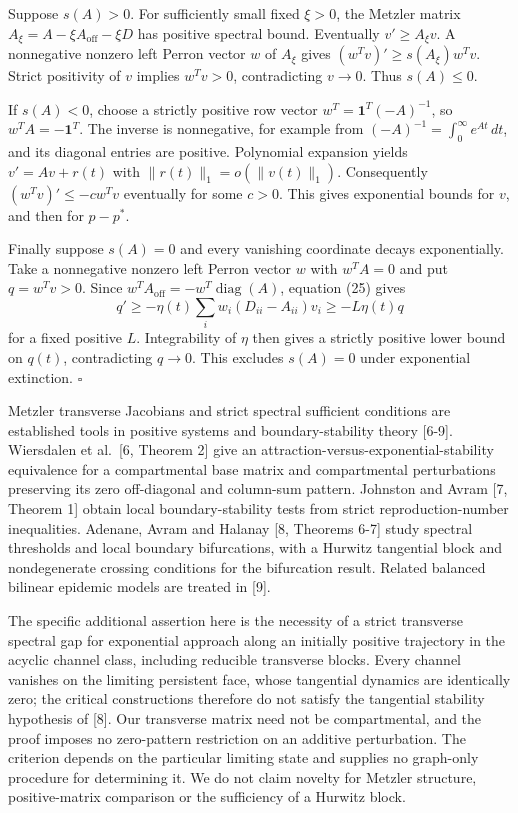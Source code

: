 \documentclass[
  11pt,
  a4paper,
]{scrartcl}
\begin{document}
Suppose \(s(A)>0\). For sufficiently small fixed \(\xi>0\), the Metzler
matrix \(A_{\xi}=A-\xi A_{\mathrm{off}}-\xi D\) has positive spectral
bound. Eventually \(v'\ge A_{\xi}v\). A nonnegative nonzero left Perron
vector \(w\) of \(A_{\xi}\) gives \((w^Tv)'\ge s(A_{\xi})w^Tv\). Strict
positivity of \(v\) implies \(w^Tv>0\), contradicting \(v\to0\). Thus
\(s(A)\le0\).

If \(s(A)<0\), choose a strictly positive row vector
\(w^T=\mathbf1^T(-A)^{-1}\), so \(w^TA=-\mathbf1^T\). The inverse is
nonnegative, for example from \((-A)^{-1}=\int_0^\infty e^{At}\,dt\),
and its diagonal entries are positive. Polynomial expansion yields
\(v'=Av+r(t)\) with \(\|r(t)\|_1=o(\|v(t)\|_1)\). Consequently
\((w^Tv)'\le-cw^Tv\) eventually for some \(c>0\). This gives exponential
bounds for \(v\), and then for \(p-p^*\).

Finally suppose \(s(A)=0\) and every vanishing coordinate decays
exponentially. Take a nonnegative nonzero left Perron vector \(w\) with
\(w^TA=0\) and put \(q=w^Tv>0\). Since
\(w^TA_{\mathrm{off}}=-w^T\operatorname{diag}(A)\), equation (25) gives
\[
q'\ge-\eta(t)\sum_iw_i(D_{ii}-A_{ii})v_i
\ge-L\eta(t)q
\tag{26}
\] for a fixed positive \(L\). Integrability of \(\eta\) then gives a
strictly positive lower bound on \(q(t)\), contradicting \(q\to0\). This
excludes \(s(A)=0\) under exponential extinction. \(\square\)

Metzler transverse Jacobians and strict spectral sufficient conditions
are established tools in positive systems and boundary-stability theory
{[}6-9{]}. Wiersdalen et al.~{[}6, Theorem 2{]} give an
attraction-versus-exponential-stability equivalence for a compartmental
base matrix and compartmental perturbations preserving its zero
off-diagonal and column-sum pattern. Johnston and Avram {[}7, Theorem
1{]} obtain local boundary-stability tests from strict
reproduction-number inequalities. Adenane, Avram and Halanay {[}8,
Theorems 6-7{]} study spectral thresholds and local boundary
bifurcations, with a Hurwitz tangential block and nondegenerate crossing
conditions for the bifurcation result. Related balanced bilinear
epidemic models are treated in {[}9{]}.

The specific additional assertion here is the necessity of a strict
transverse spectral gap for exponential approach along an initially
positive trajectory in the acyclic channel class, including reducible
transverse blocks. Every channel vanishes on the limiting persistent
face, whose tangential dynamics are identically zero; the critical
constructions therefore do not satisfy the tangential stability
hypothesis of {[}8{]}. Our transverse matrix need not be compartmental,
and the proof imposes no zero-pattern restriction on an additive
perturbation. The criterion depends on the particular limiting state and
supplies no graph-only procedure for determining it. We do not claim
novelty for Metzler structure, positive-matrix comparison or the
sufficiency of a Hurwitz block.
\end{document}
